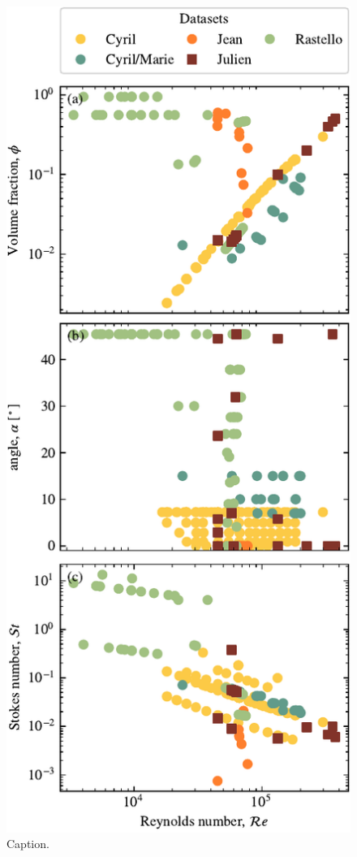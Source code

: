 \documentclass[twocolumn]{article}
\begin{document}
\begin{figure}
	\centering
	\includegraphics{figure2.pdf}
	\caption{Caption.}
	\label{fig:fig2}
\end{figure}
\end{document}
